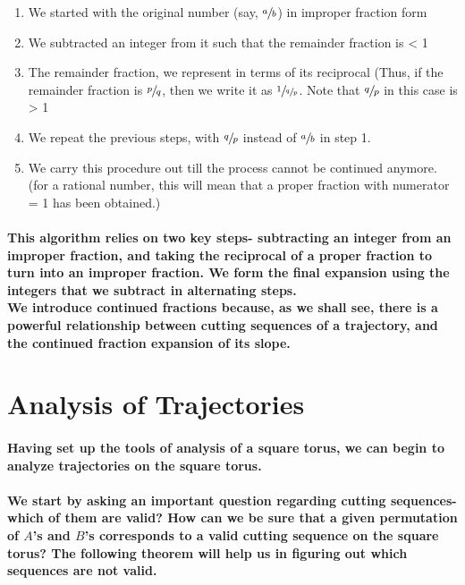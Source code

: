 \documentclass{report}
\begin{document}
\begin{enumerate}

\item  {We started with the original number (say, $\sfrac{a}{b}$) in improper fraction form}
\item  {We subtracted an integer from it such that the remainder fraction is < 1}
\item  {The remainder fraction, we represent in terms of its reciprocal (Thus, if the remainder fraction is $\sfrac{p}{q}$, then we write it as $\sfrac{1}{\sfrac{q}{p}}$. Note that $\sfrac{q}{p}$ in this case is > 1}
\item  {We repeat the previous steps, with $\sfrac{q}{p}$ instead of $\sfrac{a}{b}$ in step 1.}
\item  {We carry this procedure out till the process cannot be continued anymore. (for a rational number, this will mean that a proper fraction with numerator = 1 has been obtained.)}
\end{enumerate}

\paragraph{This algorithm relies on two key steps- subtracting an integer from an improper fraction, and taking the reciprocal of a proper fraction to turn into an improper fraction. We form the final expansion using the integers that we subtract in alternating steps.
\\
We introduce continued fractions because, as we shall see, there is a powerful relationship between cutting sequences of a trajectory, and the continued fraction expansion of its slope.}

\section{Analysis of Trajectories}

\paragraph{Having set up the tools of analysis of a square torus, we can begin to analyze trajectories on the square torus. 
\\ \\
We start by asking an important question regarding cutting sequences- which of them are valid? How can we be sure that a given permutation of $A$’s and $B$’s corresponds to a valid cutting sequence on the square torus? The following theorem will help us in figuring out which sequences are not valid.}
\end{document}
